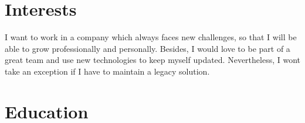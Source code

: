 \documentclass[letterpaper]{twentysecondcv} %
\begin{document}
\section{Interests}

I want to work in a company which always faces new challenges, so that I will be able to grow professionally and personally. Besides, I would love to be part of a great team and use new technologies to keep myself updated. Nevertheless, I wont take an exception if I have to maintain a legacy solution. 

\section{Education}

\begin{twenty} %
\end{twenty}



\end{document}
